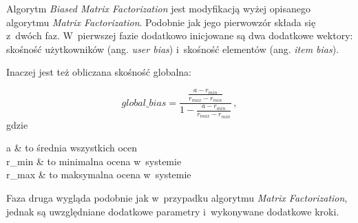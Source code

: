 \documentclass[twoside]{iisthesis}
\begin{document}
	 Algorytm \textit{Biased Matrix Factorization} jest modyfikacją wyżej opisanego algorytmu \textit{Matrix Factorization}. Podobnie jak jego pierwowzór składa się z~dwóch faz. W~pierwszej fazie dodatkowo inicjowane są dwa dodatkowe wektory: skośność użytkowników (ang. \textit{user bias}) i~skośność elementów (ang. \textit{item bias}). 
	 
	 Inaczej jest też obliczana skośność globalna: 
	 
	 \begin{equation}
	 \label{eq:global_bias}
	 global\_bias = 
	 \frac
	 { 
	 	\frac{ a - r_{min} }{ r_{max} - r_{min} }
	 }
	 {
	 	1 - \frac{ a - r_{min} }{ r_{max} - r_{min} }	
	 }
	 \,,
	 \end{equation} 		 		
	 gdzie
	 
	 \begin{conditions*}
	 	a & to średnia wszystkich ocen \\
	 	r_{min}  &  to minimalna ocena w~systemie  \\
	 	r_{max}  &  to maksymalna ocena w~systemie
	 \end{conditions*} 
	 
	 Faza druga wygląda podobnie jak w~przypadku algorytmu \textit{Matrix Factorization}, jednak są uwzględniane dodatkowe parametry i~wykonywane dodatkowe kroki.
	 
\end{document}
